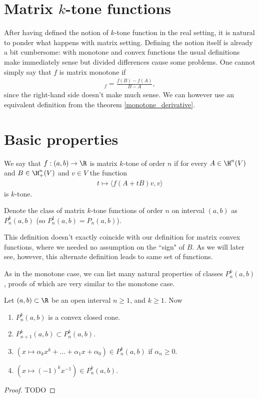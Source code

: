 \section{Matrix $k$-tone functions}

After having defined the notion of $k$-tone function in the real setting, it is natural to ponder what happens with matrix setting. Defining the notion itself is already a bit cumbersome: with monotone and convex functions the usual definitions make immediately sense but divided differences cause some problems. One cannot simply say that $f$ is matrix monotone if
\begin{align*}
	[A, B]_{f} = \frac{f(B) - f(A)}{B - A},
\end{align*}
since the right-hand side doesn't make much sense. We can however use an equivalent definition from the theorem \ref{monotone_derivative}.

\section{Basic properties}

\begin{maar}
	We say that $f : (a, b) \to \R$ is matrix $k$-tone of order $n$ if for every $A \in \H^{n}(V)$ and $B \in \H^{n}_{+}(V)$ and $v \in V$ the function
	\begin{align*}
		t \mapsto \langle f(A + t B) v, v \rangle
	\end{align*}
	is $k$-tone.
\end{maar}

Denote the class of matrix $k$-tone functions of order $n$ on interval $(a, b)$ as $P^{k}_{n}(a, b)$ (so $P^{1}_{n}(a, b) = P_{n}(a, b)$).

This definition doesn't exactly coincide with our definition for matrix convex functions, where we needed no assumption on the ``sign" of $B$. As we will later see, however, this alternate definition leads to same set of functions.


As in the monotone case, we can list many natural properties of classes $P^{k}_{n}(a, b)$, proofs of which are very similar to the monotone case.

\begin{prop}
	Let $(a, b) \subset \R$ be an open interval $n \geq 1$, and $k \geq 1$. Now
	\begin{enumerate}
		\item $P_{n}^{k}(a, b)$ is a convex closed cone.
		\item $P_{n + 1}^{k}(a, b) \subset P_{n}^{k}(a, b)$.
		\item $\left(x \mapsto \alpha_{k} x^{k} + \ldots + \alpha_{1} x + \alpha_{0}\right) \in P^{k}_{n}(a, b)$ if $\alpha_{n} \geq 0$.
		\item $\left(x \mapsto (-1)^k x^{-1}\right) \in P^{k}_{n}(a, b)$.
	\end{enumerate}
\end{prop}
\begin{proof}
	TODO
\end{proof}

